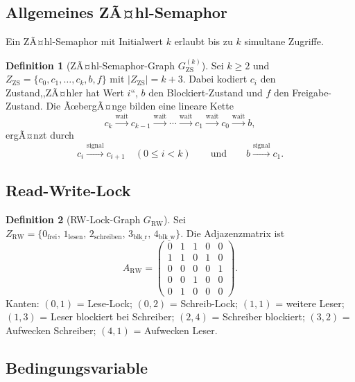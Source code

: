 ﻿\documentclass[a4paper,12pt]{article}
\theoremstyle{definition}
\newtheorem{definition}{Definition}
\begin{document}
\subsection{Allgemeines ZÃ¤hl-Semaphor}

Ein ZÃ¤hl-Semaphor mit Initialwert $k$ erlaubt bis zu $k$ simultane Zugriffe.

\begin{definition}[ZÃ¤hl-Semaphor-Graph $G_{\mathrm{ZS}}^{(k)}$]
  \label{def:zs}
  Sei $k \geq 2$ und
  $Z_{\mathrm{ZS}} = \{c_0, c_1, \ldots, c_k, b, f\}$ mit $|Z_{\mathrm{ZS}}| = k+3$.
  Dabei kodiert $c_i$ den Zustand,,ZÃ¤hler hat Wert $i$``,
  $b$ den Blockiert-Zustand und $f$ den Freigabe-Zustand.
  Die ÃœbergÃ¤nge bilden eine lineare Kette
  \[
    c_k \xrightarrow{\mathrm{wait}} c_{k-1} \xrightarrow{\mathrm{wait}}
    \cdots \xrightarrow{\mathrm{wait}} c_1 \xrightarrow{\mathrm{wait}} c_0
    \xrightarrow{\mathrm{wait}} b,
  \]
  ergÃ¤nzt durch
  \[
    c_i \xrightarrow{\mathrm{signal}} c_{i+1} \quad (0 \leq i < k)
    \qquad\text{und}\qquad
    b \xrightarrow{\mathrm{signal}} c_1.
  \]
\end{definition}

\subsection{Read-Write-Lock}

\begin{definition}[RW-Lock-Graph $G_{\mathrm{RW}}$]
  \label{def:rw}
  Sei $Z_{\mathrm{RW}} = \{0_{\mathrm{frei}},\, 1_{\mathrm{lesen}},\, 2_{\mathrm{schreiben}},\, 3_{\mathrm{blk\_r}},\, 4_{\mathrm{blk\_w}}\}$.
  Die Adjazenzmatrix ist
  \[
    A_{\mathrm{RW}} =
    \begin{pmatrix}
      0 & 1 & 1 & 0 & 0 \\
      1 & 1 & 0 & 1 & 0 \\
      0 & 0 & 0 & 0 & 1 \\
      0 & 0 & 1 & 0 & 0 \\
      0 & 1 & 0 & 0 & 0
    \end{pmatrix}.
  \]
  Kanten: $(0,1)$ = Lese-Lock; $(0,2)$ = Schreib-Lock;
  $(1,1)$ = weitere Leser; $(1,3)$ = Leser blockiert bei Schreiber;
  $(2,4)$ = Schreiber blockiert; $(3,2)$ = Aufwecken Schreiber;
  $(4,1)$ = Aufwecken Leser.
\end{definition}

\subsection{Bedingungsvariable}
\end{document}
